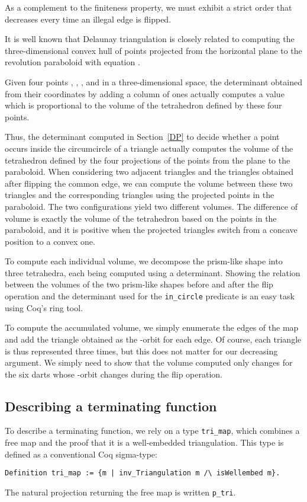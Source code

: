 \documentclass{llncs}
\begin{document}
As a complement to the finiteness property, we must exhibit a strict order
that decreases every time an illegal edge is flipped.

It is well known that Delaunay triangulation is closely related to
computing the three-dimensional convex hull of points projected from
the horizontal plane to the revolution paraboloid with equation .

Given four points , , , and  in a
three-dimensional space, the determinant obtained from their
coordinates by adding a column of ones actually computes a value which
is proportional to the volume of the tetrahedron defined by these four
points.
 

Thus, the determinant computed in Section~\ref{DP} to decide whether a
point occurs inside the circumcircle of a triangle actually computes
the volume of the tetrahedron defined by the four projections of the
points from the plane to the paraboloid. When considering two adjacent
triangles and the triangles obtained after flipping the common edge,
we can compute the volume between these two triangles
and the corresponding triangles using the projected points in the
paraboloid. The two configurations yield two different volumes.
The difference of volume is exactly the volume of the
tetrahedron based on the points in the paraboloid, and it is positive
when the projected triangles switch from a concave position to a
convex one.

To compute each individual volume, we decompose the prism-like shape
into three tetrahedra, each being computed using a
determinant. Showing the relation between the volumes of the two
prism-like shapes before and after the flip operation and the
determinant used for the {\tt in\_circle} predicate is an easy task
using Coq's ring tool.

To compute the accumulated volume, we simply enumerate the edges of the
map and add the triangle obtained as the -orbit for each edge.
Of course, each triangle is thus represented three times, but this
does not matter for our decreasing argument.  We simply need to show that the
volume computed only changes for the six darts whose -orbit
 changes during the flip operation.

\subsection{Describing a terminating function}
To describe a terminating function, we rely on a type {\tt tri\_map}, which
combines a free map and the proof that it is a well-embedded triangulation.
This type is defined as a conventional Coq sigma-type:
\begin{verbatim}
Definition tri_map := {m | inv_Triangulation m /\ isWellembed m}.
\end{verbatim}
The natural projection returning the free map is written
{\tt p\_tri}.
\end{document}
